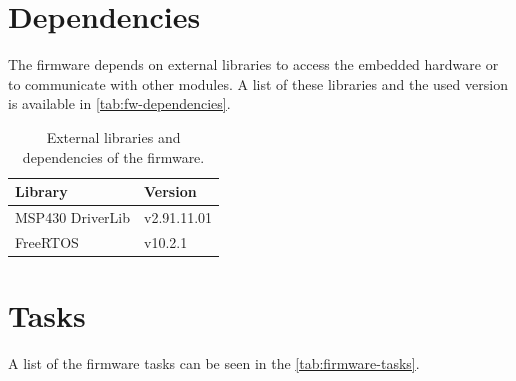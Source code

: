 \section{Dependencies}

The firmware depends on external libraries to access the embedded hardware or to communicate with other modules. A list of these libraries and the used version is available in \autoref{tab:fw-dependencies}.

\begin{table}[!ht]
    \centering
    \begin{tabular}{L{5cm}R{4cm}}
        \toprule[1.5pt]
        \textbf{Library}        & \textbf{Version} \\
        \midrule
            MSP430 DriverLib    & v2.91.11.01 \\
            FreeRTOS            & v10.2.1 \\
        \bottomrule[1.5pt]
    \end{tabular}
    \caption{External libraries and dependencies of the firmware.}
    \label{tab:fw-dependencies}
\end{table}

\section{Tasks}

A list of the firmware tasks can be seen in the \autoref{tab:firmware-tasks}.

